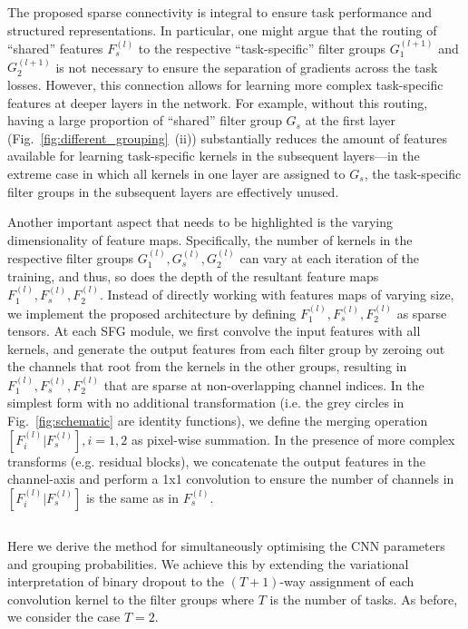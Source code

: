     
The proposed sparse connectivity is integral to ensure task performance and structured representations. In particular, one might argue that the routing of ``shared'' features $F^{(l)}_{s}$ to the respective ``task-specific'' filter groups $G^{(l+1)}_{1}$ and $G^{(l+1)}_{2}$ is not necessary to ensure the separation of gradients across the task losses. However, this connection allows for learning more complex task-specific features at deeper layers in the network. For example, without this routing, having a large proportion of ``shared'' filter group $G_{s}$ at the first layer (Fig.~\ref{fig:different_grouping}~(ii)) substantially reduces the amount of features available for learning task-specific kernels in the subsequent layers---in the extreme case in which all kernels in one layer are assigned to $G_{s}$, the task-specific filter groups in the subsequent layers are effectively unused. 

Another important aspect that needs to be highlighted is the varying dimensionality of feature maps. Specifically, the number of kernels in the respective filter groups $G^{(l)}_{1}, G^{(l)}_{s}, G^{(l)}_{2}$ can vary at each iteration of the training, and thus, so does the depth of the resultant feature maps $F^{(l)}_{1}, F^{(l)}_{s}, F^{(l)}_{2}$. Instead of directly working with features maps of varying size, we implement the proposed architecture by defining $F^{(l)}_{1}, F^{(l)}_{s}, F^{(l)}_{2}$ as sparse tensors. At each SFG module, we first convolve the input features with all kernels, and generate the output features from each filter group by zeroing out the channels that root from the kernels in the other groups, resulting in $F^{(l)}_{1}, F^{(l)}_{s}, F^{(l)}_{2}$ that are sparse at non-overlapping channel indices. In the simplest form with no additional transformation (i.e. the grey circles in Fig.~\ref{fig:schematic} are identity functions), we define the merging operation $[F^{(l)}_{i}|F^{(l)}_{s}], i = 1,2$ as pixel-wise summation. In the presence of more complex transforms (e.g. residual blocks), we concatenate the output features in the channel-axis and perform a 1x1 convolution to ensure the number of channels in $[F^{(l)}_{i}|F^{(l)}_{s}]$ is the same as in $F^{(l)}_{s}$. 


\subsection{}
Here we derive the method for simultaneously optimising the CNN parameters and grouping probabilities. We achieve this by extending the variational interpretation of binary dropout \cite{gal2016uncertainty,gal2017concrete} to the $(T+1)$-way assignment of each convolution kernel to the filter groups where $T$ is the number of tasks. As before, we consider the case $T=2$. 

